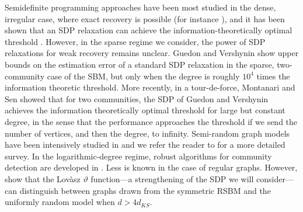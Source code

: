 Semidefinite programming approaches have been most studied in the dense, irregular case, where exact recovery is possible (for instance \cite{abbe2016exact,abbe2015community}), and it has been shown that an SDP relaxation can achieve the information-theoretically optimal threshold \cite{hajek2016achieving}. However, in the sparse regime we consider, the power of SDP relaxations for weak recovery remains unclear. Guedon and Vershynin \cite{guedon2016community} show upper bounds on the estimation error of a standard SDP relaxation in the sparse, two-community case of the SBM, but only when the degree is roughly $10^4$ times the information theoretic threshold. More recently, in a tour-de-force,  Montanari and Sen \cite{montanari2015semidefinite} showed that for two communities, the SDP of Guedon and Vershynin achieves the information theoretically optimal threshold for large but constant degree, in the sense that the performance approaches the threshold if we send the number of vertices, and then the degree, to infinity.  Semi-random graph models have been intensively studied in \cite{blum1995coloring, feige2000finding, feige2001heuristics,coja2004coloring,krivelevich2006semirandom,coja2007solving, makarychev2012approximation, chen2014clustering,guedon2016community} and we refer the reader to \cite{makarychev2016learning} for a more detailed survey. In the logarithmic-degree regime, robust algorithms for community detection are developed in \cite{cai2015robust, kumar2010clustering, awasthi2012improved}. Less is known in the case of regular graphs. However, \cite{banks2017lov} show that the Lov\`{a}sz $\vartheta$ function---a strengthening of the SDP we will consider---can distinguish between graphs drawn from the symmetric RSBM and the uniformly random model when $d > 4d_{KS}$.

